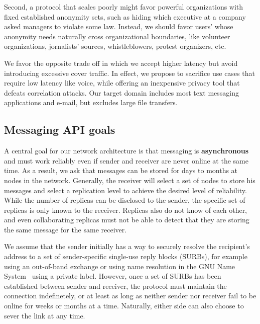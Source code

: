 \documentclass[twoside,letterpaper]{llncs}
\begin{document}
Second, a protocol that scales poorly might favor powerful
organizations with fixed established anonymity sets, such as hiding
which executive at a company asked managers to violate some law.
Instead, we should favor users' whose anonymity needs naturally
cross organizational boundaries, like volunteer organizations,
jornalists' sources, whistleblowers, protest organizers, etc.

We favor the opposite trade off in which we accept higher latency but
avoid introducing excessive cover traffic. In effect, we propose to
sacrifice use cases that require low latency like voice, while
offering an inexpensive privacy tool that defeats correlation attacks.
Our target domain includes most text messaging applications and
e-mail, but excludes large file transfers.

\subsection{Messaging API goals} 

A central goal for our network architecture is that messaging is 
{\bf asynchronous} and must work reliably even if sender and receiver
are never online at the same time.  As a result, we ask that messages
can be stored for days to months at nodes in the network.  Generally,
the receiver will select a set of nodes to store his messages and
select a replication level to achieve the desired level of
reliability. While the number of replicas can be disclosed to the
sender, the specific set of replicas is only known to the receiver.
Replicas also do not know of each other, and even collaborating
replicas must not be able to detect that they are storing the same
message for the same receiver.

We assume that the sender initially has a way to securely resolve the
recipient's address to a set of sender-specific single-use reply
blocks (SURBs), for example using an out-of-band exchange or using
name resolution in the GNU Name System~\cite{gns} using a private
label.  However, once a set of SURBs has been established between
sender and receiver, the protocol must maintain the connection
indefinetely, or at least as long as neither sender nor receiver fail
to be online for weeks or months at a time.  Naturally, either side
can also choose to sever the link at any time.
\end{document}
